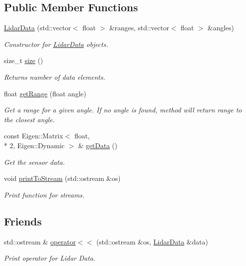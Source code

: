 \subsection*{Public Member Functions}
\begin{DoxyCompactItemize}
\item 
\hyperlink{classrlib_1_1LidarData_a57b4749e1274030136fce1e5fbbca33d}{Lidar\-Data} (std\-::vector$<$ float $>$ \&ranges, std\-::vector$<$ float $>$ \&angles)
\begin{DoxyCompactList}\small\item\em Constructor for \hyperlink{classrlib_1_1LidarData}{Lidar\-Data} objects. \end{DoxyCompactList}\item 
size\-\_\-t \hyperlink{classrlib_1_1LidarData_abf37f41dee75528211a93833e2d68520}{size} ()
\begin{DoxyCompactList}\small\item\em Returns number of data elements. \end{DoxyCompactList}\item 
float \hyperlink{classrlib_1_1LidarData_a7c0a03b228b5b85e81b35f2cc61e6008}{get\-Range} (float angle)
\begin{DoxyCompactList}\small\item\em Get a range for a given angle. If no angle is found, method will return range to the closest angle. \end{DoxyCompactList}\item 
const Eigen\-::\-Matrix$<$ float, \\*
2, Eigen\-::\-Dynamic $>$ \& \hyperlink{classrlib_1_1LidarData_a4249c865a00c72fe80c8a210667c2ca4}{get\-Data} ()
\begin{DoxyCompactList}\small\item\em Get the sensor data. \end{DoxyCompactList}\item 
void \hyperlink{classrlib_1_1LidarData_a1d9dc0bbc59f528f3d76492fd5aec816}{print\-To\-Stream} (std\-::ostream \&os)
\begin{DoxyCompactList}\small\item\em Print function for streams. \end{DoxyCompactList}\end{DoxyCompactItemize}
\subsection*{Friends}
\begin{DoxyCompactItemize}
\item 
\hypertarget{classrlib_1_1LidarData_ac142a9d8c3161d74c8d3d39c093ecde4}{std\-::ostream \& \hyperlink{classrlib_1_1LidarData_ac142a9d8c3161d74c8d3d39c093ecde4}{operator$<$$<$} (std\-::ostream \&os, \hyperlink{classrlib_1_1LidarData}{Lidar\-Data} \&data)}\label{classrlib_1_1LidarData_ac142a9d8c3161d74c8d3d39c093ecde4}

\begin{DoxyCompactList}\small\item\em Print operator for Lidar Data. \end{DoxyCompactList}\end{DoxyCompactItemize}


